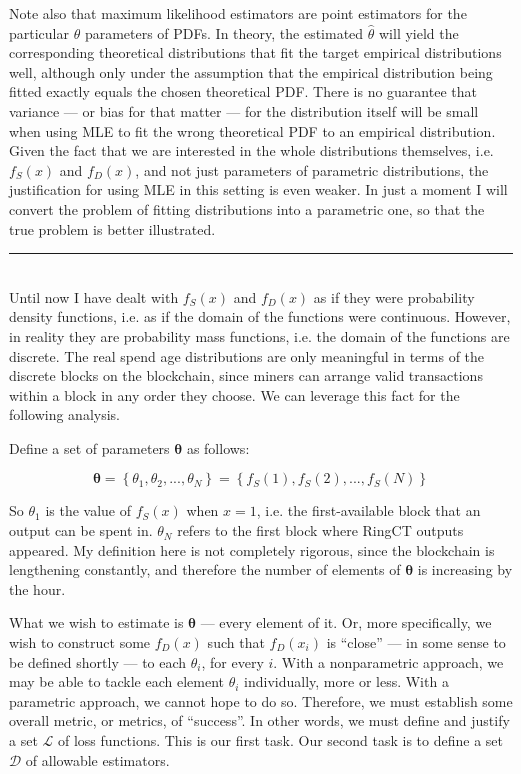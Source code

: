 \documentclass[english]{article}
\begin{document}
Note also that maximum likelihood estimators are point estimators
for the particular $\theta$ parameters of PDFs. In theory, the estimated
$\hat{\theta}$ will yield the corresponding theoretical distributions
that fit the target empirical distributions well, although only under
the assumption that the empirical distribution being fitted exactly
equals the chosen theoretical PDF. There is no guarantee that variance
--- or bias for that matter --- for the distribution itself will
be small when using MLE to fit the wrong theoretical PDF to an empirical
distribution. Given the fact that we are interested in the whole distributions
themselves, i.e. $f_{S}(x)$ and $f_{D}(x)$, and not just parameters
of parametric distributions, the justification for using MLE in this
setting is even weaker. In just a moment I will convert the problem
of fitting distributions into a parametric one, so that the true problem
is better illustrated.

\par\noindent\rule{\textwidth}{0.4pt}\\

Until now I have dealt with $f_{S}(x)$ and $f_{D}(x)$ as if they
were probability density functions, i.e. as if the domain of the functions
were continuous. However, in reality they are probability mass functions,
i.e. the domain of the functions are discrete. The real spend age
distributions are only meaningful in terms of the discrete blocks
on the blockchain, since miners can arrange valid transactions within
a block in any order they choose. We can leverage this fact for the
following analysis.

Define a set of parameters $\boldsymbol{\theta}$ as follows:

\[
\boldsymbol{\theta}=\left\{ \theta_{1},\theta_{2},...,\theta_{N}\right\} =\left\{ f_{S}(1),f_{S}(2),...,f_{S}(N)\right\} 
\]

So $\theta_{1}$ is the value of $f_{S}(x)$ when $x=1$, i.e. the
first-available block that an output can be spent in. $\theta_{N}$
refers to the first block where RingCT outputs appeared. My definition
here is not completely rigorous, since the blockchain is lengthening
constantly, and therefore the number of elements of $\boldsymbol{\theta}$
is increasing by the hour.

What we wish to estimate is $\boldsymbol{\theta}$ --- every element
of it. Or, more specifically, we wish to construct some $f_{D}(x)$
such that $f_{D}(x_{i})$ is ``close'' --- in some sense to be
defined shortly --- to each $\theta_{i}$, for every $i$. With a
nonparametric approach, we may be able to tackle each element $\theta_{i}$
individually, more or less. With a parametric approach, we cannot
hope to do so. Therefore, we must establish some overall metric, or
metrics, of ``success''. In other words, we must define and justify
a set $\mathcal{L}$ of loss functions. This is our first task. Our
second task is to define a set $\mathcal{D}$ of allowable estimators.
\end{document}
